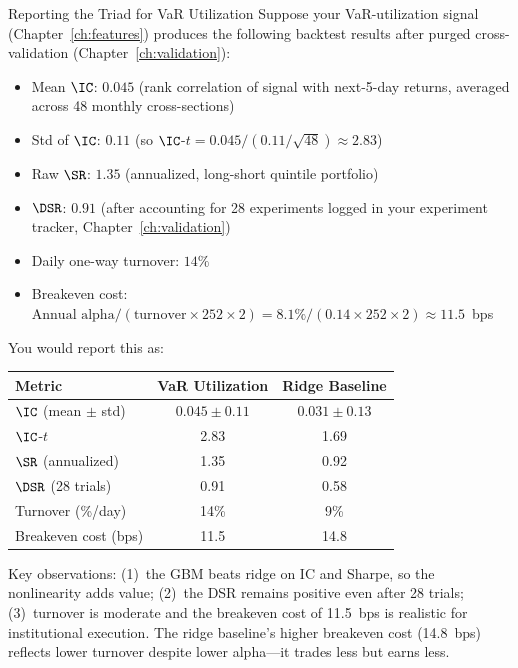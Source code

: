 \begin{workedexample}{Reporting the Triad for VaR Utilization}
Suppose your VaR-utilization signal (Chapter~\ref{ch:features}) produces
the following backtest results after purged cross-validation
(Chapter~\ref{ch:validation}):

\begin{itemize}[leftmargin=1.5em]
  \item Mean $\IC$: $0.045$ (rank correlation of signal with next-5-day
    returns, averaged across 48 monthly cross-sections)
  \item Std of $\IC$: $0.11$ (so $\IC$-$t = 0.045 / (0.11 / \sqrt{48})
    \approx 2.83$)
  \item Raw $\SR$: $1.35$ (annualized, long-short quintile portfolio)
  \item $\DSR$: $0.91$ (after accounting for 28 experiments logged in
    your experiment tracker, Chapter~\ref{ch:validation})
  \item Daily one-way turnover: $14\%$
  \item Breakeven cost: $\text{Annual alpha} / (\text{turnover} \times
    252 \times 2) = 8.1\% / (0.14 \times 252 \times 2) \approx 11.5$~bps
\end{itemize}

You would report this as:

\medskip
\begin{center}
\begin{tabular}{lcc}
  \toprule
  \textbf{Metric} & \textbf{VaR Utilization} & \textbf{Ridge Baseline} \\
  \midrule
  $\IC$ (mean $\pm$ std) & $0.045 \pm 0.11$ & $0.031 \pm 0.13$ \\
  $\IC$-$t$              & 2.83              & 1.69 \\
  $\SR$ (annualized)     & 1.35              & 0.92 \\
  $\DSR$ (28 trials)     & 0.91              & 0.58 \\
  Turnover (\%/day)      & 14\%              & 9\% \\
  Breakeven cost (bps)   & 11.5              & 14.8 \\
  \bottomrule
\end{tabular}
\end{center}

\medskip
Key observations: (1)~the GBM beats ridge on IC and Sharpe, so the
nonlinearity adds value; (2)~the DSR remains positive even after 28
trials; (3)~turnover is moderate and the breakeven cost of 11.5~bps is
realistic for institutional execution.  The ridge baseline's higher
breakeven cost (14.8~bps) reflects lower turnover despite lower alpha---it
trades less but earns less.
\end{workedexample}

